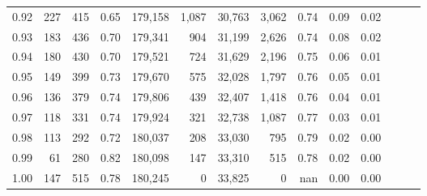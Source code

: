 \begin{tabular}{rrrrrrrrrrrrrr}
0.92 &    227 &  415 &  0.65 &  179,158 &    1,087 &  30,763 &   3,062 &  0.74 &  0.09 &      0.02 \\
0.93 &    183 &  436 &  0.70 &  179,341 &      904 &  31,199 &   2,626 &  0.74 &  0.08 &      0.02 \\
0.94 &    180 &  430 &  0.70 &  179,521 &      724 &  31,629 &   2,196 &  0.75 &  0.06 &      0.01 \\
0.95 &    149 &  399 &  0.73 &  179,670 &      575 &  32,028 &   1,797 &  0.76 &  0.05 &      0.01 \\
0.96 &    136 &  379 &  0.74 &  179,806 &      439 &  32,407 &   1,418 &  0.76 &  0.04 &      0.01 \\
0.97 &    118 &  331 &  0.74 &  179,924 &      321 &  32,738 &   1,087 &  0.77 &  0.03 &      0.01 \\
0.98 &    113 &  292 &  0.72 &  180,037 &      208 &  33,030 &     795 &  0.79 &  0.02 &      0.00 \\
0.99 &     61 &  280 &  0.82 &  180,098 &      147 &  33,310 &     515 &  0.78 &  0.02 &      0.00 \\
1.00 &    147 &  515 &  0.78 &  180,245 &        0 &  33,825 &       0 &   nan &  0.00 &      0.00 \\
\bottomrule
\end{tabular}
